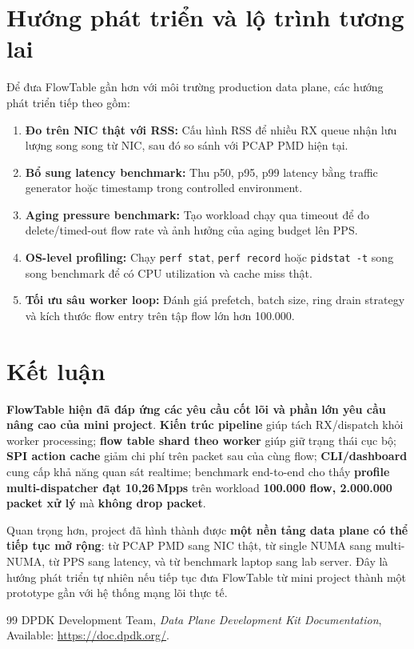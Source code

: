 \documentclass[12pt,a4paper,twoside]{report}
\newcommand{\code}[1]{\texttt{#1}}
\newcommand{\mpps}[1]{#1\,Mpps}
\begin{document}
\section{Hướng phát triển và lộ trình tương lai}
Để đưa FlowTable gần hơn với môi trường production data plane, các hướng phát
triển tiếp theo gồm:
\begin{enumerate}
    \item \textbf{Đo trên NIC thật với RSS:} Cấu hình RSS để nhiều RX queue nhận
    lưu lượng song song từ NIC, sau đó so sánh với PCAP PMD hiện tại.
    \item \textbf{Bổ sung latency benchmark:} Thu p50, p95, p99 latency bằng
    traffic generator hoặc timestamp trong controlled environment.
    \item \textbf{Aging pressure benchmark:} Tạo workload chạy qua timeout để
    đo delete/timed-out flow rate và ảnh hưởng của aging budget lên PPS.
    \item \textbf{OS-level profiling:} Chạy \code{perf stat}, \code{perf record}
    hoặc \code{pidstat -t} song song benchmark để có CPU utilization và cache
    miss thật.
    \item \textbf{Tối ưu sâu worker loop:} Đánh giá prefetch, batch size, ring
    drain strategy và kích thước flow entry trên tập flow lớn hơn 100.000.
\end{enumerate}

\section{Kết luận}
\textbf{FlowTable hiện đã đáp ứng các yêu cầu cốt lõi và phần lớn yêu cầu nâng
cao của mini project}. \textbf{Kiến trúc pipeline} giúp tách RX/dispatch khỏi
worker processing; \textbf{flow table shard theo worker} giúp giữ trạng thái
cục bộ; \textbf{SPI action cache} giảm chi phí trên packet sau của cùng flow;
\textbf{CLI/dashboard} cung cấp khả năng quan sát realtime; benchmark
end-to-end cho thấy \textbf{profile multi-dispatcher đạt \mpps{10,26}} trên
workload \textbf{100.000 flow, 2.000.000 packet xử lý} mà \textbf{không drop
packet}.

Quan trọng hơn, project đã hình thành được \textbf{một nền tảng data plane có
thể tiếp tục mở rộng}: từ PCAP PMD sang NIC thật, từ single NUMA sang
multi-NUMA, từ PPS sang latency, và từ benchmark laptop sang lab server. Đây là
hướng phát triển tự nhiên nếu tiếp tục đưa FlowTable từ mini project thành một
prototype gần với hệ thống mạng lõi thực tế.

\newpage
\begin{thebibliography}{99}
     DPDK Development Team, \textit{Data Plane Development Kit Documentation}, Available: \url{https://doc.dpdk.org/}.
\end{thebibliography}
\end{document}
